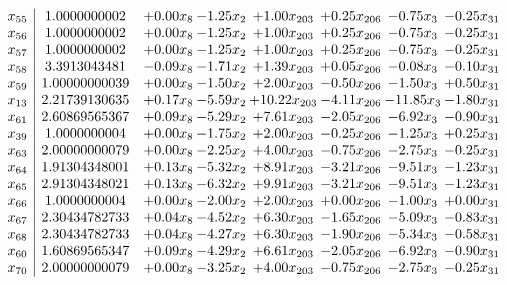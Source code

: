 \documentclass[8pt]{article}
\begin{document}
\[\begin{array}{c| c c@{\hskip 2pt} c@{\hskip 2pt} c@{\hskip 2pt} c@{\hskip 2pt} c@{\hskip 2pt} c@{\hskip 2pt} }
 x_{55}   &  1.0000000002 & +  0.00 x_{8} & -1.25 x_{2} & +  1.00 x_{203} & +  0.25 x_{206} & -0.75 x_{3} & -0.25 x_{31}\\
 x_{56}   &  1.0000000002 & +  0.00 x_{8} & -1.25 x_{2} & +  1.00 x_{203} & +  0.25 x_{206} & -0.75 x_{3} & -0.25 x_{31}\\
 x_{57}   &  1.0000000002 & +  0.00 x_{8} & -1.25 x_{2} & +  1.00 x_{203} & +  0.25 x_{206} & -0.75 x_{3} & -0.25 x_{31}\\
 x_{58}   &  3.3913043481 & -0.09 x_{8} & -1.71 x_{2} & +  1.39 x_{203} & +  0.05 x_{206} & -0.08 x_{3} & -0.10 x_{31}\\
 x_{59}   &  1.00000000039 & +  0.00 x_{8} & -1.50 x_{2} & +  2.00 x_{203} & -0.50 x_{206} & -1.50 x_{3} & +  0.50 x_{31}\\
 x_{13}   &  2.21739130635 & +  0.17 x_{8} & -5.59 x_{2} & + 10.22 x_{203} & -4.11 x_{206} & -11.85 x_{3} & -1.80 x_{31}\\
 x_{61}   &  2.60869565367 & +  0.09 x_{8} & -5.29 x_{2} & +  7.61 x_{203} & -2.05 x_{206} & -6.92 x_{3} & -0.90 x_{31}\\
 x_{39}   &  1.0000000004 & +  0.00 x_{8} & -1.75 x_{2} & +  2.00 x_{203} & -0.25 x_{206} & -1.25 x_{3} & +  0.25 x_{31}\\
 x_{63}   &  2.00000000079 & +  0.00 x_{8} & -2.25 x_{2} & +  4.00 x_{203} & -0.75 x_{206} & -2.75 x_{3} & -0.25 x_{31}\\
 x_{64}   &  1.91304348001 & +  0.13 x_{8} & -5.32 x_{2} & +  8.91 x_{203} & -3.21 x_{206} & -9.51 x_{3} & -1.23 x_{31}\\
 x_{65}   &  2.91304348021 & +  0.13 x_{8} & -6.32 x_{2} & +  9.91 x_{203} & -3.21 x_{206} & -9.51 x_{3} & -1.23 x_{31}\\
 x_{66}   &  1.0000000004 & +  0.00 x_{8} & -2.00 x_{2} & +  2.00 x_{203} & +  0.00 x_{206} & -1.00 x_{3} & +  0.00 x_{31}\\
 x_{67}   &  2.30434782733 & +  0.04 x_{8} & -4.52 x_{2} & +  6.30 x_{203} & -1.65 x_{206} & -5.09 x_{3} & -0.83 x_{31}\\
 x_{68}   &  2.30434782733 & +  0.04 x_{8} & -4.27 x_{2} & +  6.30 x_{203} & -1.90 x_{206} & -5.34 x_{3} & -0.58 x_{31}\\
 x_{60}   &  1.60869565347 & +  0.09 x_{8} & -4.29 x_{2} & +  6.61 x_{203} & -2.05 x_{206} & -6.92 x_{3} & -0.90 x_{31}\\
 x_{70}   &  2.00000000079 & +  0.00 x_{8} & -3.25 x_{2} & +  4.00 x_{203} & -0.75 x_{206} & -2.75 x_{3} & -0.25 x_{31}\\

\end{array}\]
\end{document}
